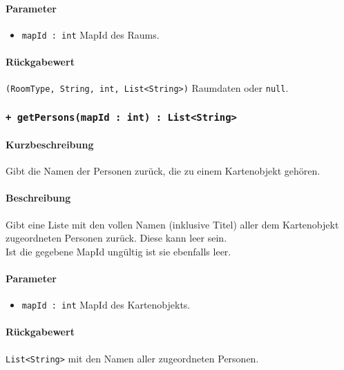 \paragraph*{Parameter}
\begin{itemize}
    \item \texttt{mapId : int} MapId des Raums.
\end{itemize}
\paragraph*{Rückgabewert}
\texttt{(RoomType, String, int, List<String>)} Raumdaten oder \texttt{null}.

\subsubsection*{\texttt{+ getPersons(mapId : int) : List<String>}}\label{App_Map_Model_getPersons_Map}%
\paragraph*{Kurzbeschreibung}
Gibt die Namen der Personen zurück, die zu einem Kartenobjekt gehören.
\paragraph*{Beschreibung}
Gibt eine Liste mit den vollen Namen (inklusive Titel) aller dem Kartenobjekt zugeordneten 
Personen zurück. Diese kann leer sein.\\
Ist die gegebene MapId ungültig ist sie ebenfalls leer.
\paragraph*{Parameter}
\begin{itemize}
    \item \texttt{mapId : int} MapId des Kartenobjekts.
\end{itemize}
\paragraph*{Rückgabewert}
\texttt{List<String>} mit den Namen aller zugeordneten Personen.

